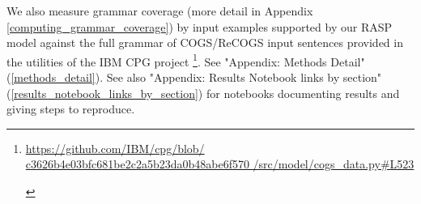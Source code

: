 \documentclass[11pt]{article}
\begin{document}
We also measure grammar coverage \cite{fuzzingbook2023:GrammarCoverageFuzzer} (more detail in Appendix \ref{computing_grammar_coverage}) by input examples supported by our RASP model against the full grammar of COGS/ReCOGS input sentences provided in the utilities of the IBM CPG project \cite{klinger2024compositionalprogramgenerationfewshot}\footnote{\begin{footnotesize}\href{https://github.com/IBM/cpg/blob/c3626b4e03bfc681be2c2a5b23da0b48abe6f570/src/model/cogs_data.py\#L523}{https://github.com/IBM/cpg/blob/
c3626b4e03bfc681be2c2a5b23da0b48abe6f570
/src/model/cogs\_data.py\#L523}
\end{footnotesize}}. See "Appendix: Methods Detail" (\ref{methods_detail}). See also "Appendix: Results Notebook links by section" (\ref{results_notebook_links_by_section}) for notebooks documenting results and giving steps to reproduce.
\end{document}
